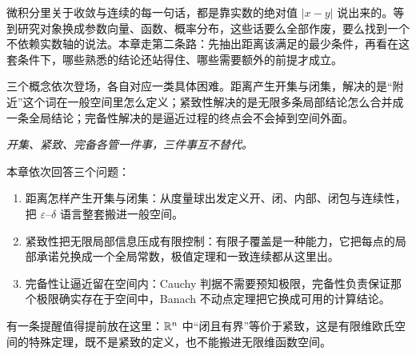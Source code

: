 微积分里关于收敛与连续的每一句话，都是靠实数的绝对值 \(|x-y|\) 说出来的。等到研究对象换成参数向量、函数、概率分布，这些话要么全部作废，要么找到一个不依赖实数轴的说法。本章走第二条路：先抽出距离该满足的最少条件，再看在这套条件下，哪些熟悉的结论还站得住、哪些需要额外的前提才成立。

三个概念依次登场，各自对应一类具体困难。距离产生开集与闭集，解决的是``附近''这个词在一般空间里怎么定义；紧致性解决的是无限多条局部结论怎么合并成一条全局结论；完备性解决的是逼近过程的终点会不会掉到空间外面。

\begin{center}
\end{center}

\emph{开集、紧致、完备各管一件事，三件事互不替代。}

本章依次回答三个问题：

\begin{enumerate}
\tightlist
\item
  距离怎样产生开集与闭集：从度量球出发定义开、闭、内部、闭包与连续性，把 \(\varepsilon\)--\(\delta\) 语言整套搬进一般空间。
\item
  紧致性把无限局部信息压成有限控制：有限子覆盖是一种能力，它把每点的局部承诺兑换成一个全局常数，极值定理和一致连续都从这里出。
\item
  完备性让逼近留在空间内：Cauchy 判据不需要预知极限，完备性负责保证那个极限确实存在于空间中，Banach 不动点定理把它换成可用的计算结论。
\end{enumerate}

有一条提醒值得提前放在这里：\(\mathbb{R}^n\) 中``闭且有界''等价于紧致，这是有限维欧氏空间的特殊定理，既不是紧致的定义，也不能搬进无限维函数空间。

